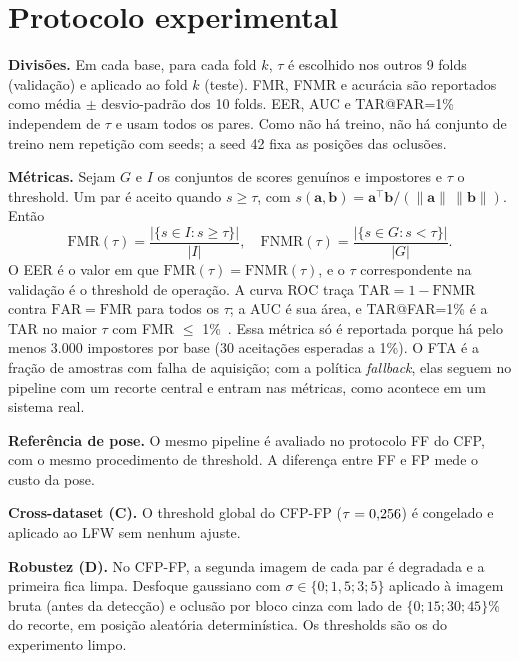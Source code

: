 \documentclass[conference,a4paper]{IEEEtran}
\begin{document}
\section{Protocolo experimental}
\textbf{Divisões.} Em cada base, para cada fold $k$, $\tau$ é escolhido nos outros 9
folds (validação) e aplicado ao fold $k$ (teste). FMR, FNMR e acurácia são reportados como
média $\pm$ desvio-padrão dos 10 folds. EER, AUC e TAR@FAR=1\% independem de $\tau$ e
usam todos os pares. Como não há treino, não há conjunto de treino nem repetição com
seeds; a seed 42 fixa as posições das oclusões.

\textbf{Métricas.} Sejam $G$ e $I$ os conjuntos de scores genuínos e impostores e
$\tau$ o threshold. Um par é aceito quando $s \geq \tau$, com
$s(\mathbf{a},\mathbf{b}) = \mathbf{a}^\top\mathbf{b}/(\lVert\mathbf{a}\rVert\,\lVert\mathbf{b}\rVert)$.
Então
\begin{equation}
\mathrm{FMR}(\tau) = \frac{|\{s \in I : s \geq \tau\}|}{|I|}, \quad
\mathrm{FNMR}(\tau) = \frac{|\{s \in G : s < \tau\}|}{|G|}.
\end{equation}
O EER é o valor em que $\mathrm{FMR}(\tau) = \mathrm{FNMR}(\tau)$, e o $\tau$
correspondente na validação é o threshold de operação. A curva ROC traça
$\mathrm{TAR} = 1 - \mathrm{FNMR}$ contra $\mathrm{FAR} = \mathrm{FMR}$ para todos
os $\tau$; a AUC é sua área, e TAR@FAR=1\% é a TAR no maior $\tau$ com FMR $\leq$
1\%~\cite{iso19795}. Essa métrica só é reportada porque há pelo menos 3.000
impostores por base (30 aceitações esperadas a 1\%). O FTA é a fração de amostras com
falha de aquisição; com a política \emph{fallback}, elas seguem no pipeline com um
recorte central e entram nas métricas, como acontece em um sistema real.

\textbf{Referência de pose.} O mesmo pipeline é avaliado no protocolo FF do CFP, com
o mesmo procedimento de threshold. A diferença entre FF e FP mede o custo da pose.

\textbf{Cross-dataset (C).} O threshold global do CFP-FP ($\tau=0{,}256$) é congelado e
aplicado ao LFW sem nenhum ajuste.

\textbf{Robustez (D).} No CFP-FP, a segunda imagem de cada par é degradada e a primeira
fica limpa. Desfoque gaussiano com $\sigma\in\{0; 1{,}5; 3; 5\}$ aplicado à imagem bruta
(antes da detecção) e oclusão por bloco cinza com lado de $\{0; 15; 30; 45\}\%$ do
recorte, em posição aleatória determinística. Os thresholds são os do experimento limpo.
\end{document}
